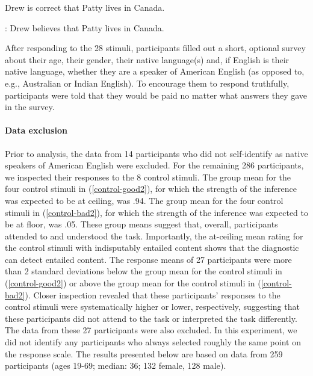 \documentclass[11pt,fleqn]{article}
\newcommand{\6}{\mbox{$[\hspace*{-.6mm}[$}}
\newcommand{\9}{\mbox{$]\hspace*{-.6mm}]$}}
\begin{document}
\begin{exe}
\ex\label{train2}
\begin{xlist}
 Drew is correct that Patty lives in Canada. 

: Drew believes that Patty lives in Canada.
\end{xlist}
\end{exe}

After responding to the 28 stimuli, participants filled out a short, optional survey about their age, their gender, their native language(s) and, if English is their native language, whether they are a speaker of American English (as opposed to, e.g., Australian or Indian English). To encourage them to respond truthfully, participants were told that they would be paid no matter what answers they gave in the survey.

\paragraph{Data exclusion}

Prior to analysis, the data from 14 participants who did not self-identify as native speakers of American English were excluded. For the remaining 286 participants, we inspected their responses to the 8 control stimuli. The group mean for the four control stimuli in (\ref{control-good2}), for which the strength of the inference was expected to be at ceiling, was .94. The group mean for the four control stimuli in (\ref{control-bad2}), for which the strength of the inference was expected to be at floor, was .05. These group means suggest that, overall, participants attended to and understood the task. Importantly, the at-ceiling mean rating for the control stimuli with indisputably entailed content shows that the diagnostic can detect entailed content. The response means of 27 participants were more than 2 standard deviations below the group mean for the control stimuli in (\ref{control-good2}) or above the group mean for the control stimuli in (\ref{control-bad2}). Closer inspection revealed that these participants' responses to the control stimuli were systematically higher or lower, respectively, suggesting that these participants did not attend to the task or interpreted the task differently. The data from these 27 participants were also excluded. In this experiment, we did not identify any participants who always selected roughly the same point on the response scale. The results presented below are based on data from 259 participants (ages 19-69; median: 36; 132 female, 128 male). %
\end{document}
